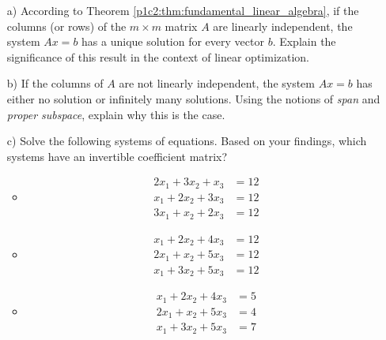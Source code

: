\begin{itemize}
	\item[a)] According to Theorem \ref{p1c2:thm:fundamental_linear_algebra}, if the columns (or rows) of the $m \times m$ matrix $A$ are linearly independent, the system $Ax=b$ has a unique solution for every vector $b$. Explain the significance of this result in the context of linear optimization.
	\item[b)] If the columns of $A$ are not linearly independent, the system $Ax = b$ has either no solution or infinitely many solutions. Using the notions of \emph{span} and \emph{proper subspace}, explain why this is the case. 
	\item[c)] Solve the following systems of equations. Based on your findings, which systems have an invertible coefficient matrix?
	\begin{itemize}
		\item \begin{align}
			2x_1 + 3x_2 + x_3 &= 12\\
			x_1 + 2x_2 + 3x_3 &= 12\\
			3x_1 + x_2 + 2x_3 &= 12
		\end{align}
		\item \begin{align}
			x_1 + 2x_2 + 4x_3 &= 12\\
			2x_1 + x_2 + 5x_3 &= 12\\
			x_1 + 3x_2 + 5x_3 &= 12
		\end{align}
		\item \begin{align}
			x_1 + 2x_2 + 4x_3 &= 5\\
			2x_1 + x_2 + 5x_3 &= 4\\
			x_1 + 3x_2 + 5x_3 &= 7
		\end{align}
	\end{itemize}
\end{itemize}

